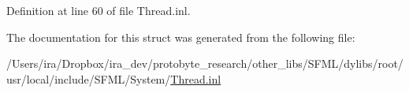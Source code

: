 Definition at line 60 of file Thread.\-inl.



The documentation for this struct was generated from the following file\-:\begin{DoxyCompactItemize}
\item 
/\-Users/ira/\-Dropbox/ira\-\_\-dev/protobyte\-\_\-research/other\-\_\-libs/\-S\-F\-M\-L/dylibs/root/usr/local/include/\-S\-F\-M\-L/\-System/\hyperlink{_thread_8inl}{Thread.\-inl}\end{DoxyCompactItemize}
